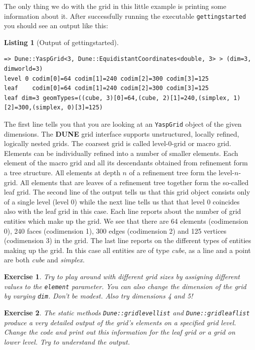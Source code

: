 \documentclass[11pt,a4paper,headinclude,footinclude,DIV16,headings=normal]{scrreprt}
\newcommand{\Dune}{{\sffamily\bfseries DUNE}\xspace}
\newtheorem{exc}{Exercise}[chapter]
\newtheorem{lst}{Listing}
\begin{document}
The only thing we do with the grid in this little example is printing
some information about it. After successfully running the executable
\lstinline!gettingstarted! you should see an output like this:

\begin{lst}[Output of gettingstarted] \mbox{}

\begin{lstlisting}[basicstyle=\ttfamily\scriptsize]
=> Dune::YaspGrid<3, Dune::EquidistantCoordinates<double, 3> > (dim=3, dimworld=3)
level 0 codim[0]=64 codim[1]=240 codim[2]=300 codim[3]=125
leaf    codim[0]=64 codim[1]=240 codim[2]=300 codim[3]=125
leaf dim=3 geomTypes=((cube, 3)[0]=64,(cube, 2)[1]=240,(simplex, 1)[2]=300,(simplex, 0)[3]=125)
\end{lstlisting}
\end{lst}

The first line tells you that you are looking at an \lstinline!YaspGrid!
object of the given dimensions. The \Dune{} grid interface supports
unstructured, locally refined, logically nested grids. The coarsest
grid is called level-0-grid or macro grid. Elements can be
individually refined into a number of smaller elements. Each element
of the macro grid and all its descendants obtained from refinement
form a tree structure. All elements at depth $n$ of a refinement tree
form the level-$n$-grid. All elements that are leaves of a refinement
tree together form the so-called leaf grid. The second line of the
output tells us that this grid object consists only of a single level
(level $0$) while the next line tells us that that level 0 coincides
also with the leaf grid in this case. Each line reports about the
number of grid entities which make up the grid. We see that there are
64 elements (codimension 0), 240 faces (codimension 1), 300 edges
(codimension 2) and 125 vertices (codimension 3) in the grid. The last
line reports on the different types of entities making up the grid. In
this case all entities are of type \emph{cube}, as a line and a point
are both \emph{cube} and \emph{simplex}.

\begin{exc} Try to play around with different grid sizes by assigning
  different values to the \lstinline!element! parameter. You can also change
  the dimension of the grid by varying \lstinline!dim!. Don't be
  modest. Also try dimensions 4 and 5!
\end{exc}

\begin{exc}
  The static methods \lstinline!Dune::gridlevellist! and
  \lstinline!Dune::gridleaflist! produce a very detailed output of the grid's
  elements on a specified grid level. Change the code and print out this
  information for the leaf grid or a grid on lower level. Try to understand the
  output.
\end{exc}
\end{document}
